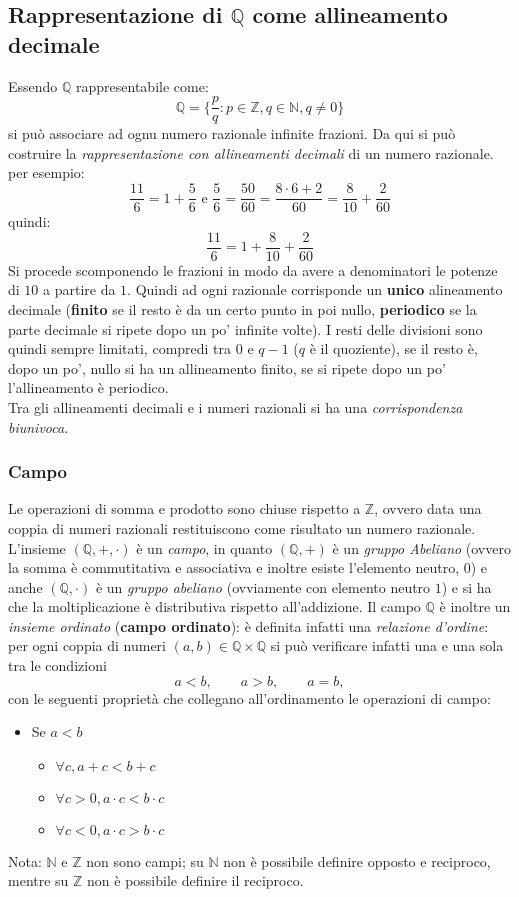 \documentclass[a4paper,12pt, oneside]{book}
\begin{document}
\subsection{Rappresentazione di $\mathbb{Q}$ come allineamento decimale}
Essendo $\mathbb{Q}$ rappresentabile come:
$$\mathbb{Q} = \{\frac{p}{q} : p\in\mathbb{Z}, q\in\mathbb{N}, q \neq 0 \}$$ si può associare ad ognu numero razionale infinite frazioni. Da qui si può costruire la \textit{rappresentazione con allineamenti decimali} di un numero razionale. per esempio:
$$\frac{11}{6}=1+\frac{5}{6} \mbox{ e } \frac{5}{6}=\frac{50}{60}=\frac{8\cdot 6+2}{60}=\frac{8}{10}+\frac{2}{60}$$
quindi: $$\frac{11}{6}=1+\frac{8}{10}+\frac{2}{60}$$
Si procede scomponendo le frazioni in modo da avere a denominatori le potenze di $10$ a partire da $1$. Quindi ad ogni razionale corrisponde un \textbf{unico} alineamento decimale (\textbf{finito} se il resto è da un certo punto in poi nullo, \textbf{periodico} se la parte decimale si ripete dopo un po' infinite volte). I resti delle divisioni sono quindi sempre limitati, compredi tra $0$ e $q-1$ ($q$ è il quoziente), se il resto è, dopo un po', nullo si ha un allineamento finito, se si ripete dopo un po' l'allineamento è periodico.\\Tra gli allineamenti decimali e i numeri razionali si ha una \textit{corrispondenza biunivoca}.
\subsubsection{Campo}
Le operazioni di somma e prodotto sono chiuse rispetto a  $\mathbb{Z}$, ovvero data una coppia di numeri razionali restituiscono come risultato un numero razionale.\\
L'insieme $(\mathbb{Q},+,\cdot)$ è un \textit{campo}, in quanto $(\mathbb{Q},+)$ è un \textit{gruppo Abeliano} (ovvero la somma è commutitativa e associativa e inoltre esiste l'elemento neutro, $0$) e anche $(\mathbb{Q},\cdot)$ è un \textit{gruppo abeliano} (ovviamente con elemento neutro $1$) e si ha che la moltiplicazione è distributiva rispetto all'addizione.
Il campo $\mathbb{Q}$ è inoltre un \textit{insieme ordinato} (\textbf{campo ordinato}): è definita infatti una \textit{relazione d'ordine}: per ogni coppia di numeri $(a,b)\in\mathbb{Q}\times\mathbb{Q}$ si può verificare infatti una e una sola tra le condizioni
$$a<b,\qquad a>b,\qquad a=b,$$
con le seguenti proprietà che collegano all'ordinamento le operazioni di campo:
\begin{itemize}
	\item Se $a<b$
	      \begin{itemize}
		      \item $\forall c, a+c<b+c$
		      \item $\forall c>0, a\cdot c<b\cdot c$
		      \item $\forall c<0, a\cdot c>b\cdot c$
	      \end{itemize}
\end{itemize}
Nota: $\mathbb{N}$ e $\mathbb{Z}$ non sono campi; su $\mathbb{N}$ non è possibile definire opposto e reciproco, mentre su $\mathbb{Z}$ non è possibile definire il reciproco.
\end{document}
